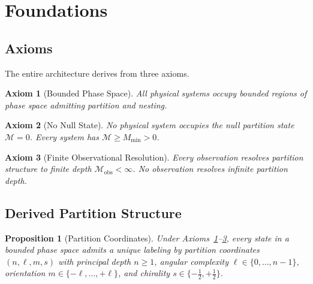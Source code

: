 \documentclass[twocolumn,10pt]{article}
\newtheorem{proposition}[theorem]{Proposition}
\newtheorem{axiom}{Axiom}
\theoremstyle{remark}
\newcommand{\Depth}{\mathcal{M}}
\newcommand{\Mmin}{M_{\mathrm{min}}}
\begin{document}
\section{Foundations}
\label{sec:foundations}

\subsection{Axioms}

The entire architecture derives from three axioms.

\begin{axiom}[Bounded Phase Space]
\label{axiom:bps}
All physical systems occupy bounded regions of phase space admitting partition and nesting.
\end{axiom}

\begin{axiom}[No Null State]
\label{axiom:nonull}
No physical system occupies the null partition state $\Depth = 0$. Every system has $\Depth \geq \Mmin > 0$.
\end{axiom}

\begin{axiom}[Finite Observational Resolution]
\label{axiom:resolution}
Every observation resolves partition structure to finite depth $\Depth_{\mathrm{obs}} < \infty$. No observation resolves infinite partition depth.
\end{axiom}

\subsection{Derived Partition Structure}

\begin{proposition}[Partition Coordinates]
\label{prop:coordinates}
Under Axioms~\ref{axiom:bps}--\ref{axiom:resolution}, every state in a bounded phase space admits a unique labeling by partition coordinates $(n, \ell, m, s)$ with principal depth $n \geq 1$, angular complexity $\ell \in \{0, \ldots, n-1\}$, orientation $m \in \{-\ell, \ldots, +\ell\}$, and chirality $s \in \{-\tfrac{1}{2}, +\tfrac{1}{2}\}$.
\end{proposition}
\end{document}
